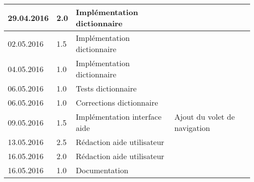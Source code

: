 \documentclass[french]{article}
\begin{document}
\begin{tabular}{p{}|p{}|p{}|p{}}
		29.04.2016 & 2.0 & Implémentation dictionnaire & \\
		\hline
		02.05.2016 & 1.5 & Implémentation dictionnaire & \\
		04.05.2016 & 1.0 & Implémentation dictionnaire & \\
		06.05.2016 & 1.0 & Tests dictionnaire & \\
		06.05.2016 & 1.0 & Corrections dictionnaire & \\
		\hline
		09.05.2016 & 1.5 & Implémentation interface aide & Ajout du volet de navigation \\
		13.05.2016 & 2.5 & Rédaction aide utilisateur & \\
		16.05.2016 & 2.0 & Rédaction aide utilisateur & \\
		16.05.2016 & 1.0 & Documentation & \\
	\end{tabular}
	
\end{document}
